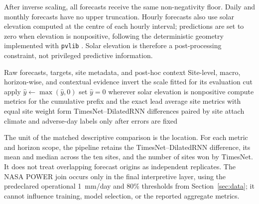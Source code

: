 After inverse scaling, all forecasts receive the same non-negativity floor.
Daily and monthly forecasts have no upper truncation. Hourly forecasts also use
solar elevation computed at the centre of each hourly interval; predictions
are set to zero when elevation is nonpositive, following the deterministic
geometry implemented with \texttt{pvlib} \cite{anderson2023}. Solar elevation
is therefore a post-processing constraint, not privileged predictive
information.

\begin{algorithm}[!t]
\caption{Block C: post-processing, metrics, and contextual analysis}
\label{alg:block_c}
\begin{algorithmic}[1]
\Require Raw forecasts, targets, site metadata, and post-hoc context
\Ensure Site-level, macro, horizon-wise, and contextual evidence
  \State invert the scale fitted for its evaluation cut
  \State apply $\widehat y\leftarrow\max(\widehat y,0)$
    \State set $\widehat y=0$ wherever solar elevation is nonpositive
  \EndIf
\EndFor
{}
  \State compute metrics for the cumulative prefix and the exact lead
\EndFor
\State average site metrics with equal site weight
\State form TimesNet--DilatedRNN differences paired by site
\State attach climate and adverse-day labels only after errors are fixed
\end{algorithmic}
\end{algorithm}

The unit of the matched descriptive comparison is the location. For each
metric and horizon scope, the pipeline retains the TimesNet--DilatedRNN
difference, its mean and median across the ten sites, and the number of sites
won by TimesNet. It does not treat overlapping forecast origins as independent
replicates. The NASA POWER join occurs only in the final interpretive layer,
using the predeclared operational 1~mm/day and 80\% thresholds from
Section~\ref{sec:data}; it cannot influence training, model selection, or the
reported aggregate metrics.
